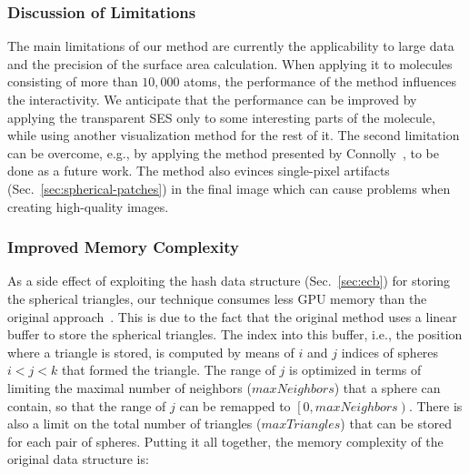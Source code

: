 \subsubsection{Discussion of Limitations}
The main limitations of our method are currently the applicability to large data and the precision of the surface area calculation.
When applying it to molecules consisting of more than $10,000$ atoms, the performance of the method influences the interactivity.
We anticipate that the performance can be improved by applying the transparent SES only to some interesting parts of the molecule, while using another visualization method for the rest of it.
The second limitation can be overcome, e.g., by applying the method presented by Connolly~\cite{connolly1983analytical}, to be done as a future work.
The method also evinces single-pixel artifacts (Sec.~\ref{sec:spherical-patches}) in the final image which can cause problems when creating high-quality images.

\subsubsection{Improved Memory Complexity}

As a side effect of exploiting the hash data structure (Sec.~\ref{sec:ecb}) for storing the spherical triangles, our technique consumes less GPU memory than the original approach~\cite{krone2011parallel}.
This is due to the fact that the original method uses a linear buffer to store the spherical triangles.
The index into this buffer, i.e., the position where a triangle is stored, is computed by means of $i$ and $j$ indices of spheres $i < j < k$ that formed the triangle.
The range of $j$ is optimized in terms of limiting the maximal number of neighbors ($maxNeighbors$) that a sphere can contain, so that the range of $j$ can be remapped to $\left[0, maxNeighbors\right)$.
There is also a limit on the total number of triangles ($maxTriangles$) that can be stored for each pair of spheres.
Putting it all together, the memory complexity of the original data structure is:

